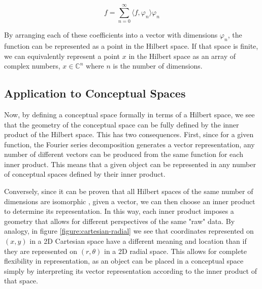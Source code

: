 \begin{equation} 
  \label{equation:fourier-series}
  f = \sum_{n=0}^\infty \langle f, \varphi_n \rangle \varphi_n
\end{equation}

By arranging each of these coefficients into a vector with dimensions $\varphi_n$, the function can be represented as a point in the Hilbert space. If that space is finite, we can equivalently represent a point $x$ in the Hilbert space as an array of complex numbers, $x \in \mathbb{C}^n$ where $n$ is the number of dimensions.

\subsection{Application to Conceptual Spaces}
\label{subsection:application-conceptual-spaces}

Now, by defining a conceptual space formally in terms of a Hilbert space, we see that the geometry of the conceptual space can be fully defined by the inner product of the Hilbert space.  This has two consequences.  First, since for a given function, the Fourier series decomposition generates a vector representation, any number of different vectors can be produced from the same function for each inner product.  This means that a given object can be represented in any number of conceptual spaces defined by their inner product.

Conversely, since it can be proven that all Hilbert spaces of the same number of dimensions are isomorphic \cite{kennedy2013hilbert}, given a vector, we can then choose an inner product to determine its representation.  In this way, each inner product imposes a geometry that allows for different perspectives of the same "raw" data.  By analogy, in figure \ref{figure:cartesian-radial} we see that coordinates represented on $(x, y)$ in a 2D Cartesian space have a different meaning and location than if they are represented on $(r, \theta)$ in a 2D radial space.  This allows for complete flexibility in representation, as an object can be placed in a conceptual space simply by interpreting its vector representation according to the inner product of that space. \cite{wiggins2018creativity}

